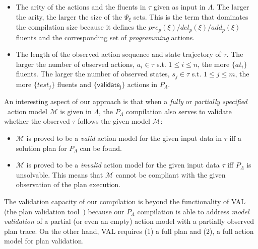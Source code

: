 \begin{itemize}
\item The arity of the actions and the fluents in $\tau$ given as input in $\Lambda$. The larger the arity, the larger the size of the $\Psi_{\xi}$ sets. This is the term that dominates the compilation size because it defines the $pre_p(\xi)/del_p(\xi)/add_p(\xi)$ fluents and the corresponding set of {\em programming} actions.
\item The length of the observed action sequence and state trajectory of $\tau$. The larger the number of observed actions, $a_i\in\tau$ s.t. $1\leq i\leq n$, the more $\{at_i\}$ fluents. The larger the number of observed states, $s_j\in\tau$ s.t. $1\leq j\leq m$, the more $\{test_j\}$ fluents and $\{\mathsf{validate_{j}}\}$ actions in $P_{\Lambda}$.
\end{itemize}

An interesting aspect of our approach is that when a {\em fully} or {\em partially specified} \strips\ action model $\mathcal{M}$ is given in $\Lambda$, the $P_{\Lambda}$ compilation also serves to validate whether the observed $\tau$ follows the given model $\mathcal{M}$:

\begin{itemize}
	\item $\mathcal{M}$ is proved to be a {\em valid} action model for the given input data in $\tau$ iff a solution plan for $P_{\Lambda}$ can be found.
	\item $\mathcal{M}$ is proved to be a {\em invalid} action model for the given input data $\tau$ iff $P_{\Lambda}$ is unsolvable. This means that $\mathcal{M}$ cannot be compliant with the given observation of the plan execution.
\end{itemize}


The validation capacity of our compilation is beyond the functionality of VAL (the plan validation tool~\cite{howey2004val}) because our $P_{\Lambda}$ compilation is able to address {\em model validation} of a partial (or even an empty) action model with a partially observed plan trace. On the other hand, VAL requires (1) a full plan and (2), a full action model for plan validation.


